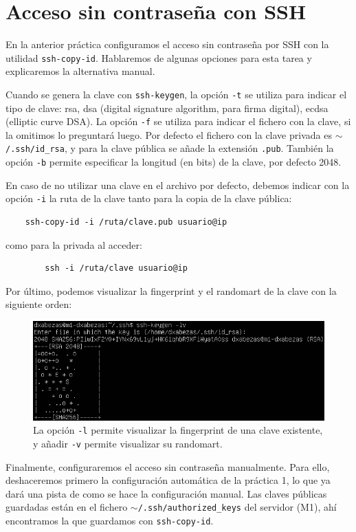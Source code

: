 \documentclass{article}
\begin{document}
\section{Acceso sin contraseña con SSH}

En la anterior práctica configuramos el acceso sin contraseña por SSH con la utilidad \texttt{ssh-copy-id}. Hablaremos de algunas opciones
para esta tarea y explicaremos la alternativa manual.

Cuando se genera la clave con \texttt{ssh-keygen}, la opción \texttt{-t} se utiliza para indicar el tipo de clave: rsa, dsa (digital
 signature algorithm, para firma digital), ecdsa (elliptic curve DSA). La opción \texttt{-f} se utiliza para indicar el fichero con la clave,
 si la omitimos lo preguntará luego. Por defecto el fichero con la clave privada es \texttt{$\mathtt{\sim}$/.ssh/id\_rsa}, y para la clave
 pública se añade la extensión \texttt{.pub}. También la opción \texttt{-b} permite especificar la longitud (en bits) de la clave, por
 defecto 2048.
 
 En caso de no utilizar una clave en el archivo por defecto, debemos indicar con la opción \texttt{-i} la ruta de la clave tanto para la
 copia de la clave pública:
 \begin{verbatim}
 	ssh-copy-id -i /ruta/clave.pub usuario@ip
 \end{verbatim}
 como para la privada al acceder:
\begin{verbatim}
		ssh -i /ruta/clave usuario@ip
\end{verbatim}

Por último, podemos visualizar la fingerprint y el randomart de la clave con la siguiente orden:

\begin{figure}[H]
	\centering
	\includegraphics[width=120mm]{imgs/ssh-fingerprint}
	\caption{La opción \texttt{-l} permite visualizar la fingerprint de una clave existente, y añadir \texttt{-v} permite visualizar
		su randomart.}
	\label{fig:ssh-fingerprint}
\end{figure}

Finalmente, configuraremos el acceso sin contraseña manualmente. Para ello, deshaceremos primero la configuración automática de la práctica 1, lo que
ya dará una pista de como se hace la configuración manual. Las claves públicas guardadas están en el fichero \texttt{$\mathtt{\sim}$/.ssh/authorized\_keys}
del servidor (M1), ahí encontramos la que guardamos con \texttt{ssh-copy-id}.
\end{document}
